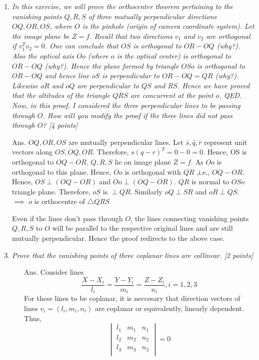 \documentclass[11pt]{article}
\begin{document}
\begin{enumerate}
\begin{itemize}
\end{itemize}


\item \textit{In this exercise, we will prove the orthocenter theorem pertaining to the vanishing points $Q,R,S$ of three mutually perpendicular directions $OQ, OR, OS$, where $O$ is the pinhole (origin of camera coordinate system). Let the image plane be $Z = f$. Recall that two directions $v_1$ and $v_2$ are orthogonal if $v^T_1 v_2 = 0$. One can conclude that $OS$ is orthogonal to $OR-OQ$ (why?). Also the optical axis $Oo$ (where $o$ is the optical center) is orthogonal to $OR-OQ$ (why?). Hence the plane formed by triangle $OSo$ is orthogonal to $OR-OQ$ and hence line $oS$ is perpendicular to $OR-OQ = QR$ (why?). Likewise $oR$ and $oQ$ are perpendicular to $QS$ and $RS$. Hence we have proved that the altitudes of the triangle $QRS$ are concurrent at the point $o$. QED. Now, in this proof, I considered the three perpendicular lines to be passing through $O$. How will you modify the proof if the three lines did not pass through $O$? \textsf{[4 points]}}
\item[Ans.] $OQ, OR, OS$ are mutually perpendicular lines.\newline
Let $\bar{s},\bar{q},\bar{r}$ represent unit vectors along $OS, OQ,OR$. Therefore, $s(q-r)^{T}=0-0=0$.\newline
Hence, OS is orthogonal to $OQ-OR$. $Q,R,S$ lie on image plane $Z=f$. As $Oo$ is orthogonal to this plane. Hence, $Oo$ is orthogonal with $QR$ ,i.e., $OQ-OR$.\newline
Hence, $OS\perp(OQ-OR)$ and $Oo\perp(OQ-OR)$. $QR$ is normal to $OSo$ triangle plane.\newline
Therefore, $oS$ is $\perp QR$. Similarly $oQ \perp SR$ and $oR \perp QS$. \newline
$\implies$ $o$ is orthocentre of $\triangle QRS$ 

Even if the lines don't pass through $O$, the lines connecting vanishing points $Q,R,S$ to $O$ will be parallel to the respective original lines and are still mutually perpendicular. Hence the proof redirects to the above case.    
   

\item \textit{Prove that the vanishing points of three coplanar lines are collinear. \textsf{[2 points]}}
\begin{itemize}
	\item[Ans.] Consider lines 
	\[
		\frac{X-X_i}{l_i} = \frac{Y-Y_i}{m_i} = \frac{Z-Z_i}{n_i}, i = 1,2,3
	\]
	For these lines to be coplanar, it is neccesary that direction vectors of lines $v_i = (l_i,m_i,n_i)$ are coplanar or equivalently, linearly dependent. Thus,
		\[
		\begin{vmatrix}
		l_1& m_1& n_1	\\
		l_2& m_2& n_2	\\
		l_3& m_3& n_3	\\	
		\end{vmatrix}
		  = 0
		\]


\end{itemize}
\end{enumerate}
\end{document}
